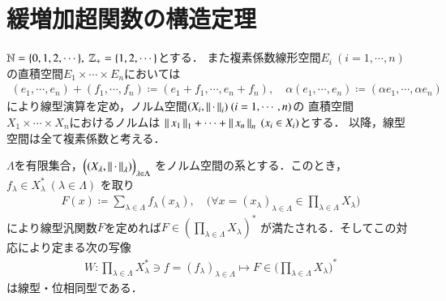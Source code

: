 \section{緩増加超関数の構造定理}
	$\mathbb{N} = \{0,1,2,\cdots\},\ \mathbb{Z}_+ = \{1,2,\cdots\}$とする．
	また複素係数線形空間$E_i\ (i=1,\cdots,n)$の直積空間$E_1 \times \cdots \times E_n$においては
	\begin{align}
		(e_1,\cdots,e_n) + (f_1,\cdots,f_n) \coloneqq (e_1 + f_1,\cdots,e_n + f_n), 
		\quad \alpha (e_1,\cdots,e_n) \coloneqq (\alpha e_1,\cdots,\alpha e_n)
	\end{align}
	により線型演算を定め，ノルム空間$(X_i,\left\|\, \cdot\, \right\|_{i})\ (i=1,\cdots,n)$の
	直積空間$X_1 \times \cdots \times X_n$におけるノルムは
	$\left\|\, x_1\, \right\|_{1} + \cdots + \left\|\, x_n\, \right\|_{n}\ (x_i \in X_i)$とする．
	以降，線型空間は全て複素係数と考える．
	\begin{screen}
		\begin{lem}
			$\Lambda$を有限集合，$\Bigl( (X_\lambda,\left\|\, \cdot\, \right\|_{\lambda}) \Bigr)_{\lambda \in \Lambda}$
			をノルム空間の系とする．このとき，$f_\lambda \in X^*_\lambda\ (\lambda \in \Lambda)$
			を取り
			\begin{align}
				F(x) \coloneqq \sum_{\lambda \in \Lambda} f_\lambda(x_\lambda),
				\quad \biggl(\forall x = (x_\lambda)_{\lambda \in \Lambda} \in \prod_{\lambda \in \Lambda} X_\lambda \biggr)
				\label{eq:lem_isomorphism_on_product_of_dual_spaces}
			\end{align}
			により線型汎関数$F$を定めれば$F \in \left( \prod_{\lambda \in \Lambda} X_\lambda \right)^*$
			が満たされる．そしてこの対応により定まる次の写像
			\begin{align}
				W:\prod_{\lambda \in \Lambda} X_\lambda^* \ni f = (f_\lambda)_{\lambda \in \Lambda}
				\longmapsto F \in \Biggl( \prod_{\lambda \in \Lambda} X_\lambda \Biggr)^*
			\end{align}
			は線型・位相同型である．
			\label{lem:isomorphism_on_product_of_dual_spaces}
		\end{lem}
	\end{screen}
	
